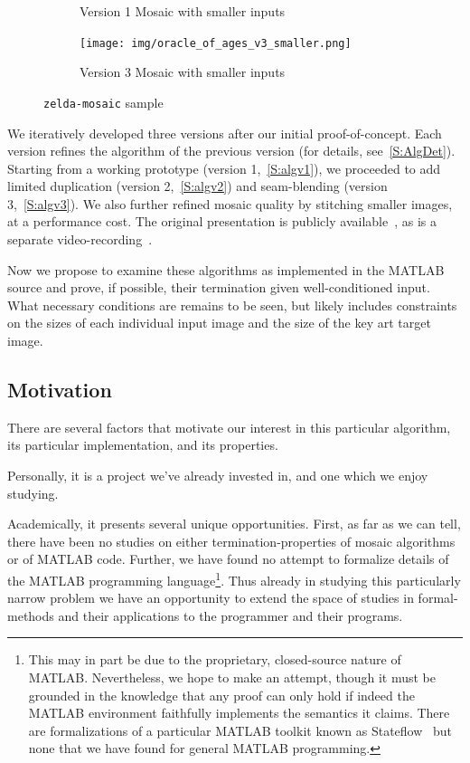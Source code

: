 \documentclass[11pt,conference]{IEEEtran}
\begin{document}
\begin{figure}[!t]
\begin{subfigure}{0.35\textwidth}
        \caption{Version 1 Mosaic with smaller inputs}
    \end{subfigure}
    \begin{subfigure}{0.35\textwidth}
        \texttt{[image: img/oracle\_of\_ages\_v3\_smaller.png]}
        \caption{Version 3 Mosaic with smaller inputs}
    \end{subfigure}
    \caption{\texttt{zelda-mosaic} sample}\label{F:zelda-mosaic-sample}
\end{figure}

We iteratively developed three versions after our initial proof-of-concept. Each
version refines the algorithm of the previous version (for details,
see~\ref{S:AlgDet}). Starting from a working prototype (version
1,~\ref{S:algv1}), we proceeded to add limited duplication (version
2,~\ref{S:algv2}) and seam-blending (version 3,~\ref{S:algv3}). We also further
refined mosaic quality by stitching smaller images, at a performance cost. The
original presentation is publicly available~\cite{zelda_mosaic_pres}, as is a
separate video-recording~\cite{zelda_mosaic_vid}.

Now we propose to examine these algorithms as implemented in the MATLAB source
and prove, if possible, their termination given well-conditioned input. What
necessary conditions are remains to be seen, but likely includes constraints on
the sizes of each individual input image and the size of the key art target
image.

\subsection{Motivation}

There are several factors that motivate our interest in this particular
algorithm, its particular implementation, and its properties.

Personally, it is a project we've already invested in, and one which we enjoy
studying.

Academically, it presents several unique opportunities. First, as far as we can
tell, there have been no studies on either termination-properties of mosaic
algorithms or of MATLAB code. Further, we have found no attempt to formalize
details of the MATLAB programming language\footnote{This may in part be due to
the proprietary, closed-source nature of MATLAB\@. Nevertheless, we hope to make
an attempt, though it must be grounded in the knowledge that any proof can only
hold if indeed the MATLAB environment faithfully implements the semantics it
claims. There are formalizations of a particular MATLAB toolkit known as
Stateflow~\cite{Hamon_2005,Hamon_2007} but none that we have found for general
MATLAB programming.}. Thus already in studying this particularly narrow problem
we have an opportunity to extend the space of studies in formal-methods and
their applications to the programmer and their programs.
\end{document}
